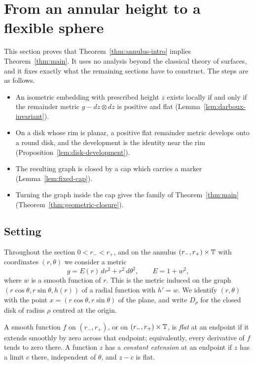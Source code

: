 \section{From an annular height to a flexible sphere}
\label{sec:geometric-closure}

This section proves that Theorem~\ref{thm:annulus-intro} implies
Theorem~\ref{thm:main}. It uses no analysis beyond the classical
theory of surfaces, and it fixes exactly what the remaining sections
have to construct. The steps are as follows.
\begin{itemize}
\item An isometric embedding with prescribed height $z$ exists locally
 if and only if the remainder metric $g-dz\otimes dz$ is positive and
 flat (Lemma~\ref{lem:darboux-invariant}).
\item On a disk whose rim is planar, a positive flat remainder metric
 develops onto a round disk, and the development is the identity near
 the rim (Proposition~\ref{lem:disk-development}).
\item The resulting graph is closed by a cap which carries a marker
 (Lemma~\ref{lem:fixed-cap}).
\item Turning the graph inside the cap gives the family of
 Theorem~\ref{thm:main} (Theorem~\ref{thm:geometric-closure}).
\end{itemize}

\subsection{Setting}

Throughout the section $0<r_-<r_+$, and on the annulus
$(r_-,r_+)\times\mathbb T$ with coordinates $(r,\theta)$ we consider a metric
\begin{equation}\label{eq:intro-metric}
 g=E(r)\,dr^2+r^2\,d\theta^2,\qquad E=1+w^2,
\end{equation}
where $w$ is a smooth function of $r$. This is the metric induced on
the graph $(r\cos\theta,r\sin\theta,h(r))$ of a radial function with
$h'=w$. We identify $(r,\theta)$ with the point
$x=(r\cos\theta,r\sin\theta)$ of the plane, and write $D_\rho$ for the
closed disk of radius $\rho$ centred at the origin.

\begin{definition}\label{def:flat-endpoint}
A smooth function $f$ on $(r_-,r_+)$, or on $(r_-,r_+)\times\mathbb T$, is
\emph{flat} at an endpoint if it extends smoothly by zero across that
endpoint; equivalently, every derivative of $f$ tends to zero there. A
function $z$ has a \emph{constant extension} at an endpoint if $z$ has
a limit $c$ there, independent of $\theta$, and $z-c$ is flat.
\end{definition}

